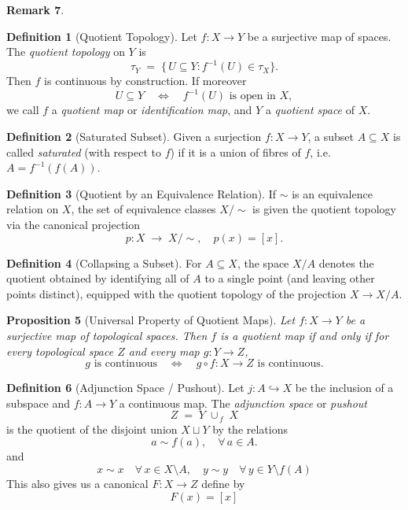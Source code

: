 \documentclass[11pt,a4paper]{article}
\theoremstyle{definition}
\newtheorem{definition}{Definition}[section]
\newtheorem{remark}[definition]{Remark}
\theoremstyle{plain}
\newtheorem{proposition}[definition]{Proposition}
\theoremstyle{remark}
\begin{document}
\begin{remark}
\begin{definition}[Quotient Topology]
Let \(f\colon X\to Y\) be a surjective map of spaces.  The \emph{quotient topology} on \(Y\) is
\[
  \tau_Y \;=\;\{\,U\subseteq Y : f^{-1}(U)\in\tau_X\}.
\]
Then \(f\) is continuous by construction.  If moreover
\[
  U\subseteq Y\quad\Longleftrightarrow\quad f^{-1}(U)\text{ is open in }X,
\]
we call \(f\) a \emph{quotient map} or \emph{identification map}, and \(Y\) a \emph{quotient space} of \(X\).
\end{definition}

\begin{definition}[Saturated Subset]
Given a surjection \(f\colon X\to Y\), a subset \(A\subseteq X\) is called \emph{saturated} (with respect to \(f\)) if it is a union of fibres of \(f\), i.e.\ \(A = f^{-1}(f(A))\).
\end{definition}

\begin{definition}[Quotient by an Equivalence Relation]
If \(\sim\) is an equivalence relation on \(X\), the set of equivalence classes \(X/\!\sim\) is given the quotient topology via the canonical projection
\[
  p\colon X\;\longrightarrow\;X/\!\sim,\quad p(x)=[x].
\]
\end{definition}

\begin{definition}[Collapsing a Subset]
For \(A\subseteq X\), the space \(X/A\) denotes the quotient obtained by identifying all of \(A\) to a single point (and leaving other points distinct), equipped with the quotient topology of the projection \(X\to X/A\).
\end{definition}

\begin{proposition}[Universal Property of Quotient Maps]
Let \(f\colon X\to Y\) be a surjective map of topological spaces.  Then \(f\) is a quotient map if and only if for every topological space \(Z\) and every map \(g\colon Y\to Z\),
\[
  g\text{ is continuous}
  \quad\Longleftrightarrow\quad
  g\circ f\colon X\to Z\text{ is continuous.}
\]
\end{proposition}

\begin{definition}[Adjunction Space / Pushout]
Let \(j\colon A\hookrightarrow X\) be the inclusion of a subspace and \(f\colon A\to Y\) a continuous map.  The \emph{adjunction space} or \emph{pushout} 
\[
  Z \;=\; Y\;\cup_{\,f}\;X
\]
is the quotient of the disjoint union \(X\sqcup Y\) by the relations
\[
  a\sim f(a),
  \quad
  \forall\,a\in A.
\]
and 
$$x \sim x \quad \forall \, x \in X \setminus A, \quad y \sim y \quad \forall\, y \in Y \setminus f(A)$$
This also gives us a canonical $F \colon X \to Z$ define by 
$$F(x) = [x]$$
\end{definition}


\end{remark}
\end{document}
